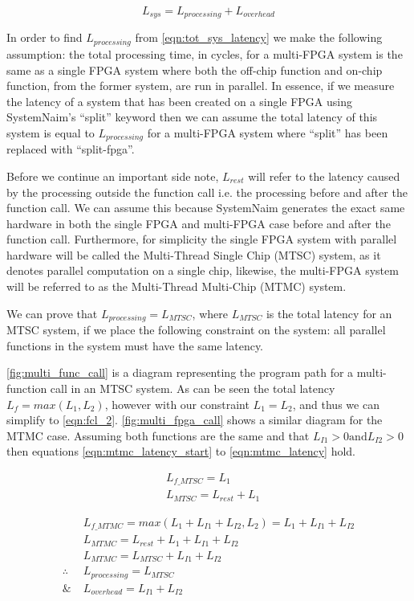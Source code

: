 \begin{equation}
    L_{sys} = L_{processing} + L_{overhead}
    \label{eqn:tot_sys_latency}
\end{equation}

In order to find $L_{processing}$ from \autoref{eqn:tot_sys_latency} we make the following assumption: the total processing time, in cycles, for a multi-FPGA system is the same as a single FPGA system where both the off-chip function and on-chip function, from the former system, are run in parallel. In essence, if we measure the latency of a system that has been created on a single FPGA using SystemNaim's “split” keyword then we can assume the total latency of this system is equal to $L_{processing}$ for a multi-FPGA system where “split” has been replaced with “split-fpga”.

Before we continue an important side note, $L_{rest}$ will refer to the latency caused by the processing outside the function call i.e. the processing before and after the function call. We can assume this because SystemNaim generates the exact same hardware in both the single FPGA and multi-FPGA case before and after the function call. Furthermore, for simplicity the single FPGA system with parallel hardware will be called the Multi-Thread Single Chip (MTSC) system, as it denotes parallel computation on a single chip, likewise, the multi-FPGA system will be referred to as the Multi-Thread Multi-Chip (MTMC) system. 

We can prove that $L_{processing} = L_{MTSC}$, where $L_{MTSC}$ is the total latency for an MTSC system, if we place the following constraint on the system: all parallel functions in the system must have the same latency.

\autoref{fig:multi_func_call} is a diagram representing the program path for a multi-function call in an MTSC system. As can be seen the total latency $L_f = max(L_1,L_2)$, however with our constraint $L_1 = L_2$, and thus we can simplify to \autoref{eqn:fcl_2}. \autoref{fig:multi_fpga_call} shows a similar diagram for the MTMC case. Assuming both functions are the same and that $L_{I1} > 0 \text{and} L_{I2} > 0 $ then equations \ref{eqn:mtmc_latency_start} to \ref{eqn:mtmc_latency} hold. 

\begin{align}
    &L_{f\_MTSC} = L_1 \label{eqn:fcl_1} \\
    &L_{MTSC} = L_{rest} + L_1 \label{eqn:fcl_2}
\end{align}

\begin{align}
    &L_{f\_MTMC} = max(L_1 + L_{I1} + L_{I2} , L_2) = L_1 + L_{I1} + L_{I2} \label{eqn:mtmc_latency_start} \\
    &L_{MTMC} = L_{rest} + L_1 + L_{I1} + L_{I2}  \\
    &L_{MTMC} = L_{MTSC} + L_{I1} + L_{I2} \\
    \therefore \; &L_{processing} = L_{MTSC} \label{eqn:mtsc_processing} \\
    \& \; &L_{overhead} = L_{I1} + L_{I2} 
    \label{eqn:mtmc_latency}
\end{align}

